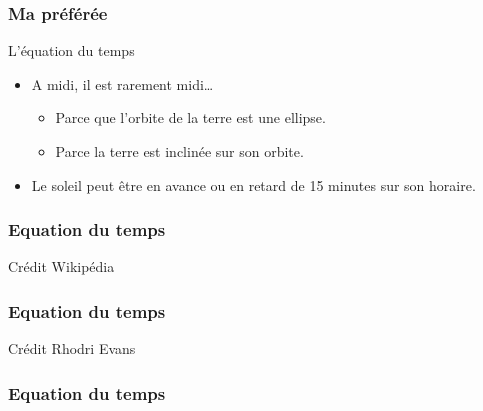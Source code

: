 \documentclass{beamer}
\begin{document}
\begin{frame}\frametitle{Ma préférée}
\begin{block}{L'équation du temps}
\begin{itemize}
\item A midi, il est rarement midi\dots
\begin{itemize}
\item Parce que l'orbite de la terre est une ellipse. 
\item Parce la terre est inclinée sur son orbite.
\end{itemize}
\item Le soleil peut être en avance ou en retard de 15 minutes sur son horaire. 
\end{itemize}

\end{block}

   \end{frame}
   \begin{frame}\frametitle{Equation du temps}
\begin{center}
\end{center}
\hfill \small Crédit Wikipédia
   \end{frame}
   
\begin{frame}\frametitle{Equation du temps}
\begin{center}
\end{center}

\hfill \small Crédit Rhodri Evans
   \end{frame}
   \begin{frame}\frametitle{Equation du temps}
\begin{center}
\end{center}
   \end{frame}
   
\end{document}
